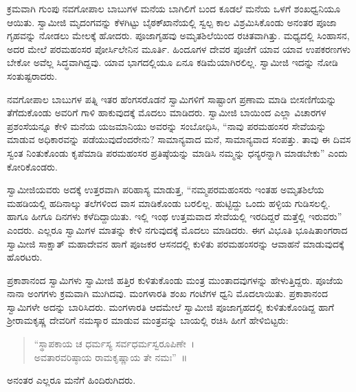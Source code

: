  ಕ್ರಮವಾಗಿ ಗುಂಪು ನವಗೋಪಾಲ ಬಾಬುಗಳ ಮನೆಯ ಬಾಗಿಲಿಗೆ ಬಂದ ಕೂಡಲೆ ಮನೆಯ ಒಳಗೆ ಶಂಖಧ್ವನಿಯೂ ಆಯಿತು. ಸ್ವಾಮೀಜಿ ಮೃದಂಗವನ್ನು ಕೆಳಗಿಟ್ಟು ಬೈಠಕ್‍ಖಾನೆಯಲ್ಲಿ ಸ್ವಲ್ಪ ಕಾಲ ವಿಶ್ರಮಿಸಿಕೊಂಡು ಅನಂತರ ಪೂಜಾ ಗೃಹವನ್ನು ನೋಡಲು ಮೇಲಕ್ಕೆ ಹೋದರು. ಪೂಜಾಗೃಹವು ಅಮೃತಶಿಲೆಯಿಂದ ರಚಿತವಾಗಿತ್ತು. ಮಧ್ಯದಲ್ಲಿ ಸಿಂಹಾಸನ, ಅದರ ಮೇಲೆ ಪರಮಹಂಸರ ಪೋರ್ಸಿ‍‍ಲೇನಿನ ಮೂರ್ತಿ. ಹಿಂದೂಗಳ ದೇವರ ಪೂಜೆಗೆ ಯಾವ ಯಾವ ಉಪಕರಣಗಳು ಬೇಕೋ ಅವೆಲ್ಲ ಸಿದ್ಧವಾಗಿದ್ದವು. ಯಾವ ಭಾಗದಲ್ಲಿಯೂ ಏನೂ ಕಡಿಮೆಯಾಗಿರಲಿಲ್ಲ. ಸ್ವಾಮೀಜಿ ಇದನ್ನು ನೋಡಿ ಸಂತುಷ್ಟರಾದರು. 

 ನವಗೋಪಾಲ ಬಾಬುಗಳ ಪತ್ನಿ ಇತರ ಹೆಂಗಸರೊಡನೆ ಸ್ವಾಮಿಗಳಿಗೆ ಸಾಷ್ಟಾಂಗ ಪ್ರಣಾಮ ಮಾಡಿ ಬೀಸಣಿಗೆಯನ್ನು ತೆಗೆದುಕೊಂಡು ಅವರಿಗೆ ಗಾಳಿ ಹಾಕುವುದಕ್ಕೆ ಮೊದಲು ಮಾಡಿದರು. ಸ್ವಾಮೀಜಿ ಬಾಯಿಂದ ಎಲ್ಲಾ ವಿಚಾರಗಳ ಪ್ರಶಂಸೆಯನ್ನೂ ಕೇಳಿ ಮನೆಯ ಯಜಮಾನಿಯು ಅವರನ್ನು ಸಂಬೋಧಿಸಿ, “ನಾವು ಪರಮಹಂಸರ ಸೇವೆಯನ್ನು ಮಾಡುವ ಅಧಿಕಾರವನ್ನು ಪಡೆಯುವುದೆಂದರೇನು? ಸಾಮಾನ್ಯವಾದ ಮನೆ, ಸಾಮಾನ್ಯವಾದ ಸಂಪತ್ತು. ತಾವು ಈ ದಿವಸ ಸ್ವಂತ ನಿಂತುಕೊಂಡು ಕೃಪೆಮಾಡಿ ಪರಮಹಂಸರ ಪ್ರತಿಷ್ಠೆಯನ್ನು ಮಾಡಿಸಿ ನಮ್ಮನ್ನು ಧನ್ಯರನ್ನಾಗಿ ಮಾಡಬೇಕು” ಎಂದು ಕೋರಿಕೊಂಡರು. 

 ಸ್ವಾಮೀಜಿಯವರು ಅದಕ್ಕೆ ಉತ್ತರವಾಗಿ ಪರಿಹಾಸ್ಯ ಮಾಡುತ್ತ, “ನಮ್ಮ\break ಪರಮಹಂಸರು ಇಂತಹ ಅಮೃತಶಿಲೆಯ ಮಹಡಿಯಲ್ಲಿ ಹದಿನಾಲ್ಕು ತಲೆಗಳಿಂದ ವಾಸ ಮಾಡಿಕೊಂಡು ಬರಲಿಲ್ಲ. ಹುಟ್ಟಿದ್ದು ಒಂದು ಹಳ್ಳಿಯ ಗುಡಿಸಲಲ್ಲಿ. ಹಾಗೂ ಹೀಗೂ ದಿನಗಳು ಕಳೆದಿದ್ದಾಯಿತು. ಇಲ್ಲಿ ಇಂಥ ಉತ್ತಮವಾದ ಸೇವೆಯಲ್ಲಿ ಇರದಿದ್ದರೆ ಮತ್ತೆಲ್ಲಿ ಇರುವರು” ಎಂದರು. ಎಲ್ಲರೂ ಸ್ವಾಮಿಗಳ ಮಾತನ್ನು ಕೇಳಿ ನಗುವುದಕ್ಕೆ ಮೊದಲು ಮಾಡಿದರು. ಈಗ ವಿಭೂತಿ ಭೂಷಿತಾಂಗರಾದ ಸ್ವಾಮೀಜಿ ಸಾಕ್ಷಾತ್ ಮಹಾದೇವನ ಹಾಗೆ ಪೂಜಕರ ಆಸನದಲ್ಲಿ ಕುಳಿತು ಪರಮಹಂಸರನ್ನು ಆವಾಹನೆ ಮಾಡುವುದಕ್ಕೆ ಹೊರಟರು. 

 ಪ್ರಕಾಶಾನಂದ ಸ್ವಾಮಿಗಳು ಸ್ವಾಮೀಜಿ ಹತ್ತಿರ ಕುಳಿತುಕೊಂಡು ಮಂತ್ರ ಮುಂತಾದವುಗಳನ್ನು ಹೇಳುತ್ತಿದ್ದರು. ಪೂಜೆಯ ನಾನಾ ಅಂಗಗಳು ಕ್ರಮವಾಗಿ ಮುಗಿದವು. ಮಂಗಳಾರತಿ ಶಂಖ ಗಂಟೆಗಳ ಧ್ವನಿ ಮೊದಲಾಯಿತು. ಪ್ರಕಾಶಾನಂದ ಸ್ವಾಮಿಗಳೇ ಅದನ್ನು ಬಾರಿಸಿದರು. ಮಂಗಳಾರತಿ ಆದಮೇಲೆ ಸ್ವಾಮೀಜಿ ಪೂಜಾಗೃಹದಲ್ಲಿ ಕುಳಿತುಕೊಂಡಿದ್ದ ಹಾಗೆ ಶ‍್ರೀರಾಮಕೃಷ್ಣ ದೇವರಿಗೆ ನಮಸ್ಕಾರ ಮಾಡುವ ಮಂತ್ರವನ್ನು ಬಾಯಲ್ಲಿ ರಚಿಸಿ ಹೀಗೆ ಹೇಳಿಬಿಟ್ಟರು: 

\newpage

\begin{verse}
“ಸ್ಥಾಪಕಾಯ ಚ ಧರ್ಮಸ್ಯ ಸರ್ವಧರ್ಮಸ್ವರೂಪಿಣೇ~। \\ಅವತಾರವರಿಷ್ಠಾಯ ರಾಮಕೃಷ್ಣಾಯ ತೇ ನಮಃ”~॥ 
\end{verse}

 ಅನಂತರ ಎಲ್ಲರೂ ಮನೆಗೆ ಹಿಂದಿರುಗಿದರು. 

